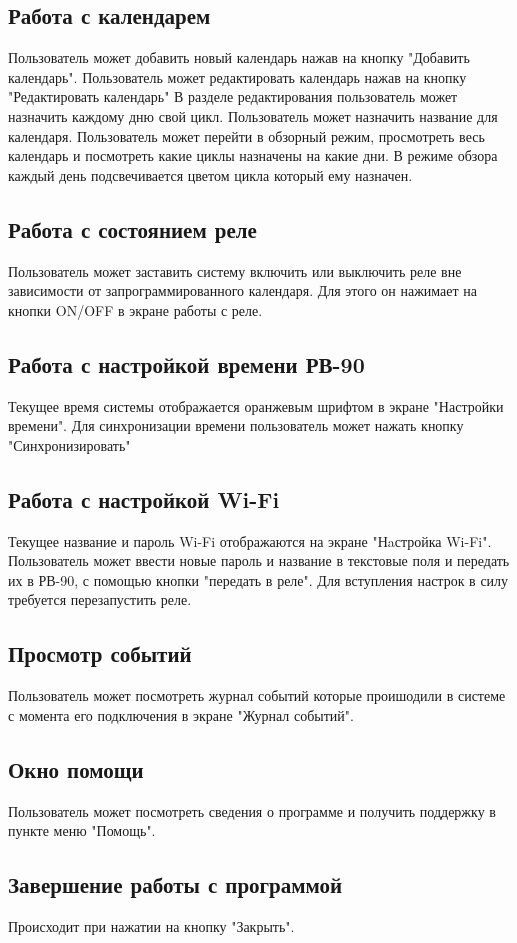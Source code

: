 \subsection{Работа с календарем}
Пользователь может добавить новый календарь нажав на кнопку "Добавить календарь".
Пользователь может редактировать календарь нажав на кнопку "Редактировать календарь"
В разделе редактирования пользователь может назначить каждому дню свой цикл.
Пользователь может назначить название для календаря.
Пользователь может перейти в обзорный режим, просмотреть весь календарь и посмотреть какие циклы назначены на какие дни. В режиме обзора каждый день подсвечивается цветом цикла который ему назначен. 

\subsection{Работа с состоянием реле}
Пользователь может заставить систему включить или выключить реле вне зависимости от запрограммированного календаря. Для этого он нажимает на кнопки ON/OFF в экране работы с реле.

\subsection{Работа с настройкой времени РВ-90}
Текущее время системы отображается оранжевым шрифтом в экране "Настройки времени".
Для синхронизации времени пользователь может нажать кнопку "Синхронизировать"

\subsection{Работа с настройкой Wi-Fi}
Текущее название и пароль Wi-Fi отображаются на экране "Нaстройка Wi-Fi".
Пользователь может ввести новые пароль и название в текстовые поля и передать их 
в РВ-90, с помощью кнопки "передать в реле". Для вступления настрок в силу требуется перезапустить реле.

\subsection{Просмотр событий}
Пользователь может посмотреть журнал событий которые проишодили в системе с момента его подключения в экране "Журнал событий".

\subsection{Окно помощи}
Пользователь может посмотреть сведения о программе и получить поддержку в пункте меню "Помощь".

\subsection{Завершение работы с программой}
Происходит при нажатии на кнопку "Закрыть".

